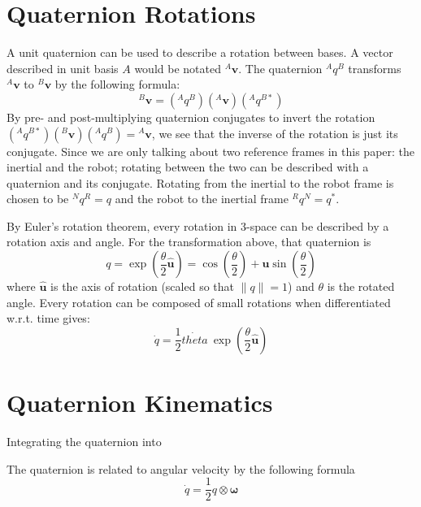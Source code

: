 \documentclass{amsart}
\theoremstyle{definition}
\theoremstyle{remark}
\numberwithin{equation}{section}
\begin{document}
\section*{Quaternion Rotations}
A unit quaternion can be used to describe a rotation between bases. A vector described in unit basis $A$ would be notated $^A\mathbf{v}$. The quaternion $^Aq^B$ transforms $^A\mathbf{v}$ to $^B\mathbf{v}$ by the following formula:
\begin{equation}
  {^B\mathbf{v}} = \left({^Aq^B}\right)\left( {^A\mathbf{v}}\right)\left( {^Aq^{B*}}\right)
\end{equation}
By pre- and post-multiplying quaternion conjugates to invert the rotation $\left({^Aq^{B*}}\right)\left({^B\mathbf{v}}\right)\left({^Aq^B}\right)={^A\mathbf{v}}$, we see that the inverse of the rotation is just its conjugate. Since we are only talking about two reference frames in this paper: the inertial and the robot; rotating between the two can be described with a quaternion and its conjugate. Rotating from the inertial to the robot frame is chosen to be ${^Nq^R}=q$ and the robot to the inertial frame ${^Rq^N}=q^*$.

By Euler's rotation theorem, every rotation in 3-space can be described by a rotation axis and angle. For the transformation above, that quaternion is
\begin{equation}
  q = \exp\left(\frac{\theta}{2}\hat{\mathbf{u}}\right) = \cos\left(\frac{\theta}{2}\right) + \mathbf{u} \sin\left( \frac{\theta}{2}\right)
\end{equation}
where $\hat{\mathbf{u}}$ is the axis of rotation (scaled so that $\|q\|=1$) and $\theta$ is the rotated angle. Every rotation can be composed of small rotations when differentiated w.r.t. time gives:
\begin{equation}
  \dot{q} = \frac{1}{2} \dot{theta} \ \exp\left(\frac{\theta}{2} \hat{\mathbf{u}} \right)
\end{equation}

\section*{Quaternion Kinematics}
Integrating the quaternion into

The quaternion is related to angular velocity by the following formula
\begin{equation}
  \dot{q} = \frac{1}{2} q \otimes \boldsymbol\omega
\end{equation}
\end{document}
